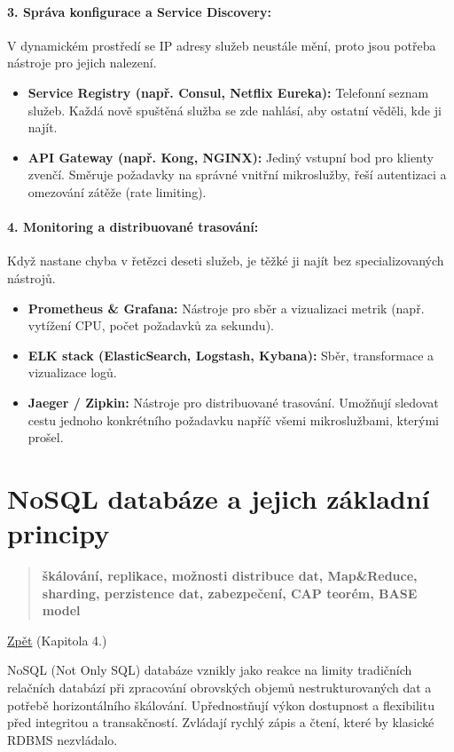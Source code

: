 \paragraph*{3. Správa konfigurace a Service Discovery:}
V dynamickém prostředí se IP adresy služeb neustále mění, proto jsou potřeba nástroje pro jejich nalezení.
\begin{itemize}
    \item \textbf{Service Registry (např. Consul, Netflix Eureka):} Telefonní seznam služeb. Každá nově spuštěná služba se zde nahlásí, aby ostatní věděli, kde ji najít.
    \item \textbf{API Gateway (např. Kong, NGINX):} Jediný vstupní bod pro klienty zvenčí. Směruje požadavky na správné vnitřní mikroslužby, řeší autentizaci a omezování zátěže (rate limiting).
\end{itemize}

\paragraph*{4. Monitoring a distribuované trasování:}
Když nastane chyba v řetězci deseti služeb, je těžké ji najít bez specializovaných nástrojů.
\begin{itemize}
    \item \textbf{Prometheus \& Grafana:} Nástroje pro sběr a vizualizaci metrik (např. vytížení CPU, počet požadavků za sekundu).
    \item \textbf{ELK stack (ElasticSearch, Logstash, Kybana):} Sběr, transformace a vizualizace logů.
    \item \textbf{Jaeger / Zipkin:} Nástroje pro distribuované trasování. Umožňují sledovat cestu jednoho konkrétního požadavku napříč všemi mikroslužbami, kterými prošel.
\end{itemize}

\section{NoSQL databáze a jejich základní principy}
\label{sec:nosql}
\begin{quote}
    \textbf{škálování, replikace, možnosti distribuce dat, Map\&Reduce, sharding, perzistence dat, zabezpečení, CAP teorém, BASE model}
\end{quote}
\hyperref[sub:dv]{Zpět} (Kapitola 4.)

NoSQL (Not Only SQL) databáze vznikly jako reakce na limity tradičních relačních databází při zpracování obrovských objemů nestrukturovaných dat a potřebě horizontálního škálování.
Upřednostňují výkon dostupnost a flexibilitu před integritou a transakčností.
Zvládají rychlý zápis a čtení, které by klasické RDBMS nezvládalo.

